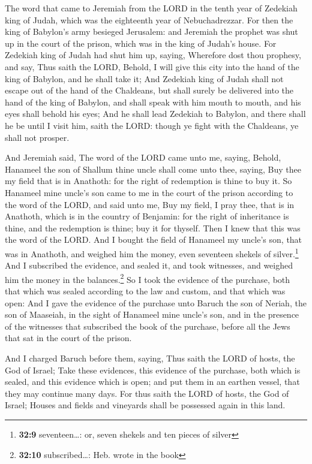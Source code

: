 The word that came to Jeremiah from the LORD in the tenth
year of Zedekiah king of Judah, which was the eighteenth year of
Nebuchadrezzar.  For then the king of Babylon's army
besieged Jerusalem: and Jeremiah the prophet was shut up in the court of
the prison, which was in the king of Judah's house.  For
Zedekiah king of Judah had shut him up, saying, Wherefore dost thou
prophesy, and say, Thus saith the LORD, Behold, I will give this city
into the hand of the king of Babylon, and he shall take it;
 And Zedekiah king of Judah shall not escape out of the
hand of the Chaldeans, but shall surely be delivered into the hand of
the king of Babylon, and shall speak with him mouth to mouth, and his
eyes shall behold his eyes;  And he shall lead Zedekiah to
Babylon, and there shall he be until I visit him, saith the LORD: though
ye fight with the Chaldeans, ye shall not prosper.

 And Jeremiah said, The word of the LORD came unto me,
saying,  Behold, Hanameel the son of Shallum thine uncle
shall come unto thee, saying, Buy thee my field that is in Anathoth: for
the right of redemption is thine to buy it.  So Hanameel
mine uncle's son came to me in the court of the prison according to the
word of the LORD, and said unto me, Buy my field, I pray thee, that is
in Anathoth, which is in the country of Benjamin: for the right of
inheritance is thine, and the redemption is thine; buy it for thyself.
Then I knew that this was the word of the LORD.  And I
bought the field of Hanameel my uncle's son, that was in Anathoth, and
weighed him the money, even seventeen shekels of silver.\footnote{\textbf{32:9}
  seventeen\ldots: or, seven shekels and ten pieces of silver}
 And I subscribed the evidence, and sealed it, and took
witnesses, and weighed him the money in the balances.\footnote{\textbf{32:10}
  subscribed\ldots: Heb. wrote in the book}  So I took
the evidence of the purchase, both that which was sealed according to
the law and custom, and that which was open:  And I gave
the evidence of the purchase unto Baruch the son of Neriah, the son of
Maaseiah, in the sight of Hanameel mine uncle's son, and in the presence
of the witnesses that subscribed the book of the purchase, before all
the Jews that sat in the court of the prison.

 And I charged Baruch before them, saying,
 Thus saith the LORD of hosts, the God of Israel; Take
these evidences, this evidence of the purchase, both which is sealed,
and this evidence which is open; and put them in an earthen vessel, that
they may continue many days.  For thus saith the LORD of
hosts, the God of Israel; Houses and fields and vineyards shall be
possessed again in this land.

